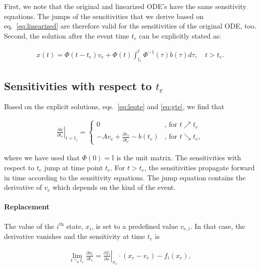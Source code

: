 \documentclass[journal, a4paper]{IEEEtran}
\begin{document}
First, we note that the original and linearized ODE's have the same
sensitivity equations. The jumps of the sensitivities that we derive
based on eq.~\eqref{eq:linearized} are therefore valid for the
sensitivities of the original ODE, too. Second, the solution after the
event time $t_e$ can be explicitly stated as:

\begin{align}
    x(t) = \Phi(t-t_e)v_e + \Phi(t)\int_{t_e}^{t}\Phi^{-1}(\tau)b(\tau)d\tau,\quad t > t_e.
    \label{eq:gte}
\end{align}

\subsection{Sensitivities with respect to $t_e$}

Based on the explicit solutions, eqs.~\eqref{eq:leqte} and
\eqref{eq:gte}, we find that

\begin{align}
    \left.\frac{\partial x}{\partial t_e}\right|_{t = t_e} =
    \left\{
    \begin{array}{ll}
    0     & \textrm{, for } t\nearrow t_e \\ %
    -A v_e + \frac{\partial v_e}{\partial t_e} - b(t_e)     & \textrm{, for }t \searrow t_e,
    \end{array}
    \right.
    \label{eq:jump}
\end{align}

where we have used that $\Phi(0) = \mathbb I$ is the unit matrix. The
sensitivities with respect to $t_e$ jump at time point $t_e$. For $t >
t_e$, the sensitivities propagate forward in time according to the
sensitivity equations. The jump equation contains the derivative of
$v_e$ which depends on the kind of the event.\\

\paragraph{Replacement}

The value of the $i^{\textrm{th}}$ state, $x_i$, is set to a predefined value
$v_{e, i}$. In that case, the derivative vanishes and the sensitivity
at time $t_e$ is

\begin{align}
    \lim_{t\searrow t_e}\frac{\partial x_i}{\partial t_e} = \left.\frac{\partial f_i}{\partial x}\right|_{x_e}\cdot (x_e - v_e) - f_i(x_e),
    \label{eq:replace}
\end{align}
\end{document}
